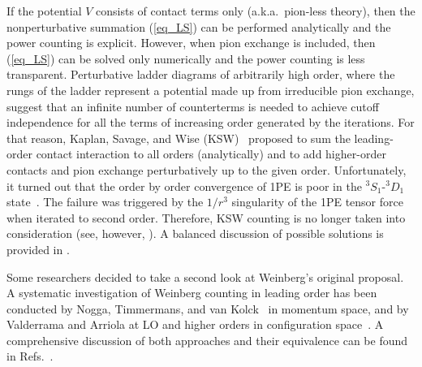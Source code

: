 \documentclass[sort&compress,preprint,3p]{elsarticle}
\begin{document}
If the potential $V$ consists of contact terms only (a.k.a.\
pion-less theory), then
the nonperturbative summation (\ref{eq_LS})
can be performed analytically and the power counting is explicit.
However, when pion exchange is included, then (\ref{eq_LS})
can be solved only numerically and the power counting
is less transparent.
Perturbative ladder diagrams of arbitrarily high order,
where the rungs of the ladder represent a potential made up from
irreducible pion exchange,
suggest that an infinite number of counterterms is needed to achieve
cutoff independence for all the terms of increasing order generated
by the iterations.
For that reason, 
Kaplan, Savage, and Wise (KSW)~\cite{KSW96} proposed 
to sum the leading-order contact interaction to all orders (analytically)
and to add higher-order contacts and
pion exchange perturbatively up to the given order. Unfortunately,
it turned out that the order by order convergence of 1PE 
is poor in the $^3S_1$-$^3D_1$ state~\cite{FMS00}. 
The failure was triggered by the $1/r^3$ singularity of the 1PE tensor
force when iterated to second order. Therefore, KSW counting is no
longer taken into consideration (see, however, \cite{BKV08}).  
A balanced discussion of possible
solutions is provided in \cite{Bea02}.

Some researchers decided to take
a second look at Weinberg's original proposal.
A systematic investigation of Weinberg counting in leading order
has been conducted by Nogga, Timmermans, and van Kolck~\cite{NTK05}
in momentum space, and by Valderrama and Arriola
at LO and higher orders in
configuration space~\cite{VA05-1,VA05-2,VA07}. A comprehensive
discussion of both approaches and their equivalence can be found
in Refs.~\cite{Ent08,Val08}.
\end{document}
